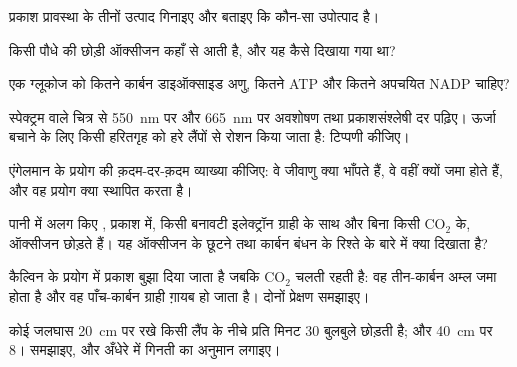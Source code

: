 \begin{exercise}[$\star$]\label{exo:g12:photosynthesis:3}
प्रकाश प्रावस्था के तीनों उत्पाद गिनाइए और बताइए कि कौन-सा उपोत्पाद है।
\end{exercise}

\begin{exercise}[$\star$]\label{exo:g12:photosynthesis:4}
किसी पौधे की छोड़ी ऑक्सीजन कहाँ से आती है, और यह कैसे दिखाया गया था?
\end{exercise}

\begin{exercise}[$\star$]\label{exo:g12:photosynthesis:5}
एक ग्लूकोज को कितने कार्बन डाइऑक्साइड अणु, कितने ATP और कितने अपचयित NADP
चाहिए?
\end{exercise}

\begin{exercise}[$\star\star$]\label{exo:g12:photosynthesis:6}
स्पेक्ट्रम वाले चित्र से \qty{550}{nm} पर और \qty{665}{nm} पर अवशोषण तथा
प्रकाशसंश्लेषी दर पढ़िए। ऊर्जा बचाने के लिए किसी हरितगृह को हरे लैंपों से
रोशन किया जाता है: टिप्पणी कीजिए।
\end{exercise}

\begin{exercise}[$\star\star$]\label{exo:g12:photosynthesis:7}
एंगेलमान के प्रयोग की क़दम-दर-क़दम व्याख्या कीजिए: वे जीवाणु क्या भाँपते
हैं, वे वहीं क्यों जमा होते हैं, और वह प्रयोग क्या स्थापित करता है।
\end{exercise}

\begin{exercise}[$\star\star$]\label{exo:g12:photosynthesis:8}
पानी में अलग किए , प्रकाश में, किसी बनावटी इलेक्ट्रॉन ग्राही के साथ
और बिना किसी $\mathrm{CO_2}$ के, ऑक्सीजन छोड़ते हैं। यह ऑक्सीजन के छूटने
तथा कार्बन बंधन के रिश्ते के बारे में क्या दिखाता है?
\end{exercise}

\begin{exercise}[$\star\star$]\label{exo:g12:photosynthesis:9}
कैल्विन के प्रयोग में प्रकाश बुझा दिया जाता है जबकि $\mathrm{CO_2}$ चलती
रहती है: वह तीन-कार्बन अम्ल जमा होता है और वह पाँच-कार्बन ग्राही ग़ायब हो
जाता है। दोनों प्रेक्षण समझाइए।
\end{exercise}

\begin{exercise}[$\star\star$]\label{exo:g12:photosynthesis:10}
कोई जलघास \qty{20}{cm} पर रखे किसी लैंप के नीचे प्रति मिनट 30 बुलबुले
छोड़ती है; और \qty{40}{cm} पर 8। समझाइए, और अँधेरे में गिनती का अनुमान
लगाइए।
\end{exercise}

